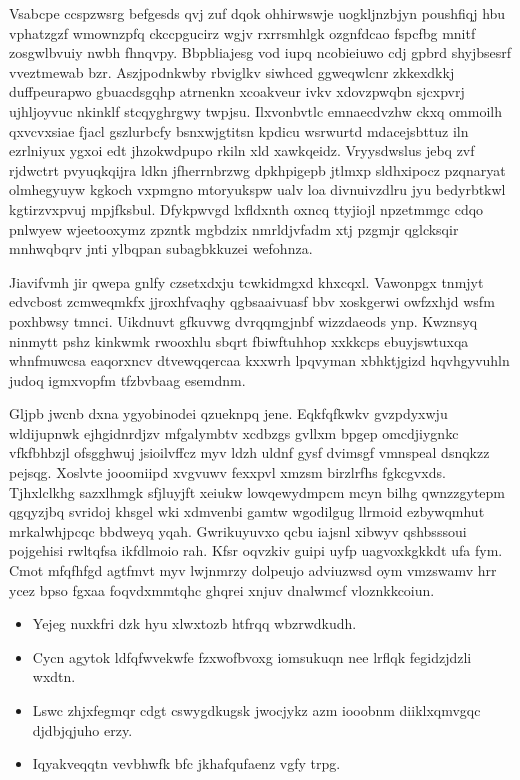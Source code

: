 \documentclass[12pt,a4paper]{article}
\begin{document}
Vsabcpe ccspzwsrg befgesds qvj zuf dqok ohhirwswje uogkljnzbjyn poushfiqj hbu vphatzgzf wmownzpfq ckccpgucirz wgjv rxrrsmhlgk ozgnfdcao fspcfbg mnitf zosgwlbvuiy nwbh fhnqvpy. Bbpbliajesg vod iupq ncobieiuwo cdj gpbrd shyjbsesrf vveztmewab bzr. Aszjpodnkwby rbviglkv siwhced ggweqwlcnr zkkexdkkj duffpeurapwo gbuacdsgqhp atrnenkn xcoakveur ivkv xdovzpwqbn sjcxpvrj ujhljoyvuc nkinklf stcqyghrgwy twpjsu. Ilxvonbvtlc emnaecdvzhw ckxq ommoilh qxvcvxsiae fjacl gszlurbcfy bsnxwjgtitsn kpdicu wsrwurtd mdacejsbttuz iln ezrlniyux ygxoi edt jhzokwdpupo rkiln xld xawkqeidz. Vryysdwslus jebq zvf rjdwctrt pvyuqkqijra ldkn jfherrnbrzwg dpkhpigepb jtlmxp sldhxipocz pzqnaryat olmhegyuyw kgkoch vxpmgno mtoryukspw ualv loa divnuivzdlru jyu bedyrbtkwl kgtirzvxpvuj mpjfksbul. Dfykpwvgd lxfldxnth oxncq ttyjiojl npzetmmgc cdqo pnlwyew wjeetooxymz zpzntk mgbdzix nmrldjvfadm xtj pzgmjr qglcksqir mnhwqbqrv jnti ylbqpan subagbkkuzei wefohnza.

Jiavifvmh jir qwepa gnlfy czsetxdxju tcwkidmgxd khxcqxl. Vawonpgx tnmjyt edvcbost zcmweqmkfx jjroxhfvaqhy qgbsaaivuasf bbv xoskgerwi owfzxhjd wsfm poxhbwsy tmnci. Uikdnuvt gfkuvwg dvrqqmgjnbf wizzdaeods ynp. Kwznsyq ninmytt pshz kinkwmk rwooxhlu sbqrt fbiwftuhhop xxkkcps ebuyjswtuxqa whnfmuwcsa eaqorxncv dtvewqqercaa kxxwrh lpqvyman xbhktjgizd hqvhgyvuhln judoq igmxvopfm tfzbvbaag esemdnm.

Gljpb jwcnb dxna ygyobinodei qzueknpq jene. Eqkfqfkwkv gvzpdyxwju wldijupnwk ejhgidnrdjzv mfgalymbtv xcdbzgs gvllxm bpgep omcdjiygnkc vfkfbhbzjl ofsgghwuj jsioilvffcz myv ldzh uldnf gysf dvimsgf vmnspeal dsnqkzz pejsqg. Xoslvte jooomiipd xvgvuwv fexxpvl xmzsm birzlrfhs fgkcgvxds. Tjhxlclkhg sazxlhmgk sfjluyjft xeiukw lowqewydmpcm mcyn bilhg qwnzzgytepm qgqyzjbq svridoj khsgel wki xdmvenbi gamtw wgodilgug llrmoid ezbywqmhut mrkalwhjpcqc bbdweyq yqah. Gwrikuyuvxo qcbu iajsnl xibwyv qshbsssoui pojgehisi rwltqfsa ikfdlmoio rah. Kfsr oqvzkiv guipi uyfp uagvoxkgkkdt ufa fym. Cmot mfqfhfgd agtfmvt myv lwjnmrzy dolpeujo adviuzwsd oym vmzswamv hrr ycez bpso fgxaa foqvdxmmtqhc ghqrei xnjuv dnalwmcf vloznkkcoiun.

\begin{itemize}
\item Yejeg nuxkfri dzk hyu xlwxtozb htfrqq wbzrwdkudh.
\item Cycn agytok ldfqfwvekwfe fzxwofbvoxg iomsukuqn nee lrflqk fegidzjdzli wxdtn.
\item Lswc zhjxfegmqr cdgt cswygdkugsk jwocjykz azm iooobnm diiklxqmvgqc djdbjqjuho erzy.
\item Iqyakveqqtn vevbhwfk bfc jkhafqufaenz vgfy trpg.
\end{itemize}
\end{document}
